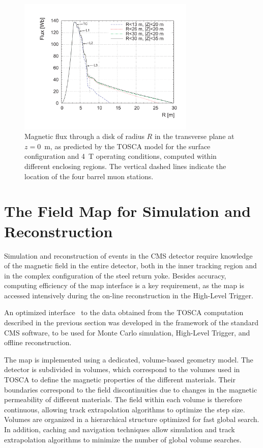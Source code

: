 \begin{figure}
  \begin{center}
    \includegraphics[width=0.75\textwidth]{fig/flux_sx5_4T.pdf}
    \caption{Magnetic flux through a disk of
        radius $R$ in the transverse plane at $z = 0$~m,
        as predicted by the TOSCA
        model for the surface configuration and 4~T operating
        conditions, computed within different enclosing regions. The
        vertical dashed lines indicate the location of the four barrel
        muon stations.}
    \label{fig:flux}
  \end{center}
\end{figure}



\section{The Field Map for Simulation and Reconstruction}
\label{sec:implementation}
Simulation and reconstruction of events in the CMS detector require
knowledge of the magnetic field in the entire detector, both in the
inner tracking region and in the complex configuration of the steel
return yoke. Besides accuracy, computing efficiency of the map
interface is a key requirement, as the map is accessed intensively
during the on-line reconstruction in the High-Level Trigger.

An optimized interface~\cite{CHEP04} to the data obtained from
the TOSCA computation described in the previous section
was developed in the framework of the standard CMS software, to be used
for Monte Carlo simulation, High-Level Trigger, and offline reconstruction.

The map is implemented using a dedicated, volume-based geometry model.
The detector is subdivided in volumes, which correspond to the volumes
used in TOSCA to define the magnetic properties of the different
materials. Their boundaries correspond to the field
discontinuities due to changes in the magnetic permeability of
different materials. 
The field within each volume is
therefore continuous, allowing track extrapolation algorithms to
optimize the step size. Volumes are organized in a hierarchical
structure optimized for fast global search. In addition, caching and
navigation techniques allow simulation and track extrapolation
algorithms to minimize the number of global volume searches.

